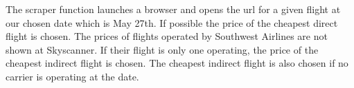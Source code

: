 The scraper function launches a browser and opens the url for a given flight at our chosen date which is May 27th. If possible the price of the cheapest direct flight is chosen. The prices of flights operated by Southwest Airlines are not shown at Skyscanner. If their flight is only one operating, the price of the cheapest indirect flight is chosen. The cheapest indirect flight is also chosen if no carrier is operating at the date.


